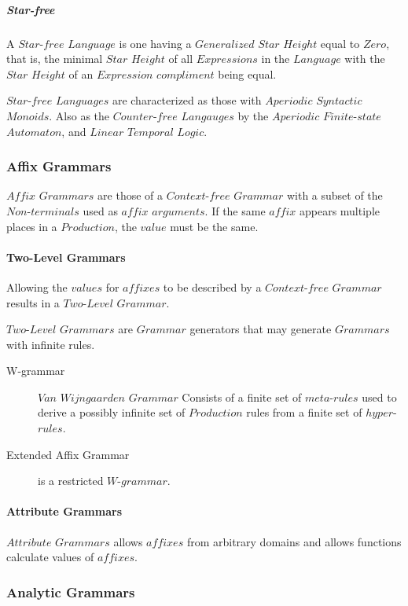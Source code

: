 \documentclass{article}
\begin{document}
    \subparagraph{Star-free}
    A $Star$-$free$ $Language$ is one having a $Generalized$ $Star$
    $Height$ equal to $Zero$, that is, the minimal $Star$ $Height$ of
    all $Expressions$ in the $Language$ with the $Star$ $Height$ of an
    $Expression$ $compliment$ being equal.

    $Star$-$free$ $Languages$ are characterized as those with
    $Aperiodic$ $Syntactic$ $Monoids$. Also as the $Counter$-$free$
    $Langauges$ by the $Aperiodic$ $Finite$-$state$ $Automaton$, and
    $Linear$ $Temporal$ $Logic$.

\subsubsection{Affix Grammars}

    $Affix$ $Grammars$ are those of a $Context$-$free$ $Grammar$ with
    a subset of the $Non$-$terminals$ used as $affix$ $arguments$. If
    the same $affix$ appears multiple places in a $Production$, the
    $value$ must be the same.

    \paragraph{Two-Level Grammars}
    Allowing the $values$ for $affixes$ to be described by a
    $Context$-$free$ $Grammar$ results in a $Two$-$Level$ $Grammar$.

    $Two$-$Level$ $Grammars$ are $Grammar$ generators that may
    generate $Grammars$ with infinite rules.

    \begin{description}
    \item[W-grammar] $Van$ $Wijngaarden$ $Grammar$
    Consists of a finite set of $meta$-$rules$ used to derive a
    possibly infinite set of $Production$ rules from a finite set of
    $hyper$-$rules$.
    \item[Extended Affix Grammar] is a restricted $W$-$grammar$.
    \end{description}

    \paragraph{Attribute Grammars}
    $Attribute$ $Grammars$ allows $affixes$ from arbitrary domains and
    allows functions calculate values of $affixes$.

\subsubsection{Analytic Grammars}
\end{document}
